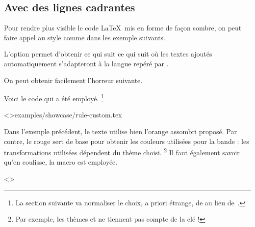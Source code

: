 \documentclass{tutodoc}
\begin{document}
\subsection{Avec des lignes cadrantes}

Pour rendre plus visible le code \LaTeX\ mis en forme de façon sombre, on peut faire appel au style  comme dans les exemple suivants.


\begin{tdocexa}
	L'option  permet d'obtenir ce qui suit ce qui suit où les textes ajoutés automatiquement s'adapteront à la langue repéré par \thisproj.

	
\end{tdocexa}


\begin{tdocexa}
	On peut obtenir facilement l'horreur suivante.

	
	
	Voici le code qui a été employé.%
	\footnote{
		La section suivante va normaliser le choix, a priori étrange, de  au lieu de \,.
	}

	\tdoclatexinput<>{examples/showcase/rule-custom.tex}
\end{tdocexa}


\begin{tdocnote}
    Dans l'exemple précédent, le texte utilise bien l'orange assombri proposé. Par contre, le rouge sert de base pour obtenir les couleurs utilisées pour la bande : les transformations utilisées dépendent du thème choisi.%
    \footnote{
        Par exemple, les thèmes  et  ne tiennent pas compte de la clé  !
    }
    Il faut également savoir qu'en coulisse, la macro  est employée.

    \begin{tdoclatex}<>
    \end{tdoclatex}
\end{tdocnote}
\end{document}
